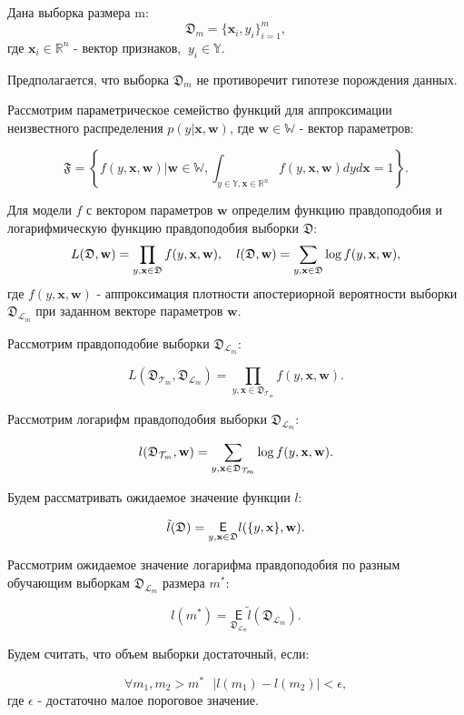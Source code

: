 \documentclass[12pt,twoside]{article}
\begin{document}
Дана выборка размера m:
$$
\mathfrak D_m = \{\textbf{x}_i, y_i\}_{i=1}^m,
$$
где $\textbf{x}_i \in \mathbb{R}^{n}$ - вектор признаков, $~y_i \in \mathbb{Y}$.

Предполагается, что выборка $\mathfrak D_m$ не противоречит гипотезе порождения данных.

Рассмотрим параметрическое семейство функций для аппроксимации неизвестного распределения $p(y | \textbf{x}, \textbf{w})$, где $\textbf{w} \in \mathbb{W}$ - вектор параметров:

$$
\mathfrak{F} = \left\{f(y, \textbf{x}, \textbf{w}) | \textbf{w} \in \mathbb{W}, \int_{y \in \mathbb{Y}, \textbf{x} \in \mathbb{R}^n} f(y, \textbf{x}, \textbf{w})dyd\textbf{x} = 1\right\}.
$$

Для модели $f$ с вектором параметров $\textbf{w}$ определим функцию правдоподобия и логарифмическую функцию правдоподобия выборки $\mathfrak D$:
$$
L(\mathfrak{D}, \textbf{w}) = \prod_{y, \textbf{x} \in \mathfrak D} f(y, \textbf{x}, \textbf{w}),~~~ l(\mathfrak D, \textbf w) = \sum_{y, \textbf{x} \in \mathfrak D}\log f(y, \textbf{x}, \textbf{w}),
$$
где $f(y, \textbf{x}, \textbf{w})$ - аппроксимация плотности апостериорной вероятности выборки $\mathfrak D_{\mathcal L_m}$ при заданном векторе параметров $\textbf{w}$.

Рассмотрим правдоподобие выборки $\mathfrak D_{\mathcal L_m}$:

$$
L(\mathfrak D_{\mathcal T_m}, \mathfrak D_{\mathcal L_m}) = \prod_{y, \textbf{x} \in \mathfrak D_{\mathcal T_m}} f(y, \textbf{x},  \textbf{w}).
$$

Рассмотрим логарифм правдоподобия выборки $\mathfrak D_{\mathcal L_m}$:

$$
l(\mathfrak D_{\mathcal T_m}, \textbf w) = \sum_{y, \textbf{x} \in \mathfrak D_{\mathcal T_m}}\log f(y, \textbf{x}, \textbf{w}).
$$

Будем рассматривать ожидаемое значение функции $l$:

$$
\tilde{l}(\mathfrak D)  = \underset{y, \textbf{x} \in \mathfrak D}{\mathsf E} l(\{y, \textbf{x}\}, \textbf w).
$$

Рассмотрим ожидаемое значение логарифма правдоподобия по разным обучающим выборкам $\mathfrak D_{\mathcal L_m}$ размера $m^*$:

$$
l(m^*) = \underset{\mathfrak D_{\mathcal L_m}}{\mathsf E} \tilde{l}(\mathfrak D_{\mathcal L_m}).
$$

Будем считать, что объем выборки достаточный, если:

$$
\forall m_1, m_2 > m^* ~~~ |l(m_1) - l(m_2)| < \epsilon,
$$
где $\epsilon$ - достаточно малое пороговое значение.
\end{document}
